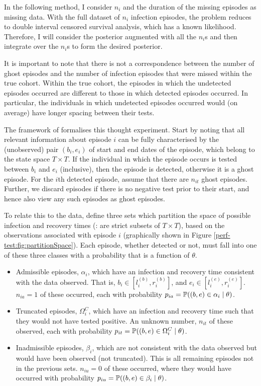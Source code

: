 \documentclass[thesis.tex]{subfiles}
\begin{document}
In the following method, I consider $n_i$ and the duration of the missing episodes as missing data.
With the full dataset of $n_i$ infection episodes, the problem reduces to double interval censored survival analysis, which has a known likelihood.
Therefore, I will consider the posterior augmented with all the $n_i$s and then integrate over the $n_i$s to form the desired posterior.

It is important to note that there is not a correspondence between the number of ghost episodes and the number of infection episodes that were missed within the true cohort.
Within the true cohort, the episodes in which the undetected episodes occurred are different to those in which detected episodes occurred.
In particular, the individuals in which undetected episodes occurred would (on average) have longer spacing between their tests.

The framework of \textcite{heiseyModelling} formalises this thought experiment.
Start by noting that all relevant information about episode $i$ can be fully characterised by the (unobserved) pair $(b_i, e_i)$ of start and end dates of the episode, which belong to the state space $T \times T$.
If the individual in which the episode occurs is tested between $b_i$ and $e_i$ (inclusive), then the episode is detected, otherwise it is a ghost episode.
For the $i$th detected episode, assume that there are $n_{it}$ ghost episodes.
Further, we discard episodes if there is no negative test prior to their start, and hence also view any such episodes as ghost episodes.

To relate this to the data, define three sets which partition the space of possible infection and recovery times (\ie: are strict subsets of $T \times T$), based on the observations associated with episode $i$ (graphically shown in Figure \ref{perf-test:fig:partitionSpace}).
Each episode, whether detected or not, must fall into one of these three classes with a probability that is a function of $\theta$.

\begin{itemize}
\item
  Admissible episodes, $\alpha_i$, which have an infection and
  recovery time consistent with the data observed. That is, $b_i \in [l_i^{(b)}, r_i^{(b)}]$, and $e_i \in [l_i^{(e)}, r_i^{(e)}]$.
  $n_{ia} =1$ of these occurred, each with probability
  $p_{ia} = \operatorname{\mathbb{P}}((b, e) \in \alpha_i \mid \theta)$.
\item
  Truncated episodes, $\Omega_i^C$, which have an infection and
  recovery time such that they would not have tested positive. An
  unknown number, $n_{it}$ of these observed, each with probability
  $p_{it} = \operatorname{\mathbb{P}}((b, e) \in \Omega^C_i \mid \theta)$.
\item
  Inadmissible episodes, $\beta_i$, which are not consistent with the data observed but would have been
  observed (not truncated). This is all remaining episodes not in the
  previous sets. $n_{iu} = 0$ of these occurred, where they would have
  occurred with probability
  $p_{iu} = \operatorname{\mathbb{P}}((b, e) \in \beta_i \mid \theta)$.
\end{itemize}
\end{document}
